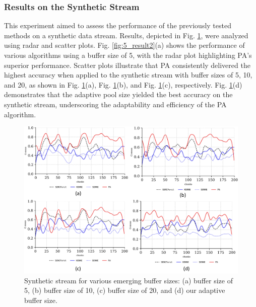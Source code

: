 \subsubsection{Results on the Synthetic Stream}
This experiment aimed to assess the performance of the previously tested methods on a synthetic data stream. Results, depicted in Fig. \ref{fig:5_result3}, were analyzed using radar and scatter plots. Fig. \ref{fig:5_result2}(a) shows the performance of various algorithms using a buffer size of 5, with the radar plot highlighting PA's superior performance. Scatter plots illustrate that PA consistently delivered the highest accuracy when applied to the synthetic stream with buffer sizes of 5, 10, and 20, as shown in Fig. \ref{fig:5_result3}(a), Fig. \ref{fig:5_result3}(b), and Fig. \ref{fig:5_result3}(c), respectively. Fig. \ref{fig:5_result3}(d) demonstrates that the adaptive pool size yielded the best accuracy on the synthetic stream, underscoring the adaptability and efficiency of the PA algorithm.

\begin{figure}[!ht]
	\centering
	\includegraphics[width=1\linewidth]{5_Emerging/figures/result3}
	\caption{Synthetic stream for various emerging buffer sizes: (a) buffer size of 5, (b) buffer size of 10, (c) buffer size of 20, and (d) our adaptive buffer size.}
	\label{fig:5_result3}
\end{figure}

